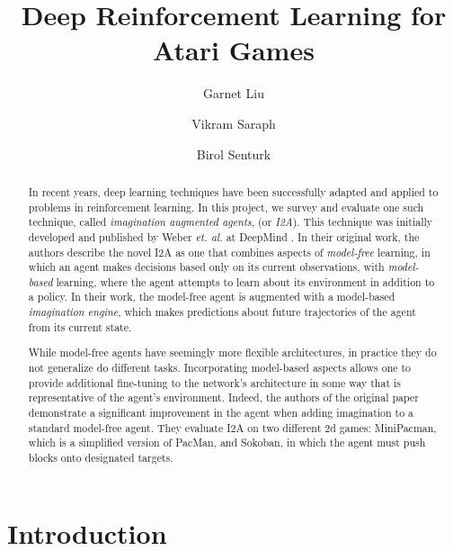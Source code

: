 \documentclass[10pt, twocolumn]{article}
\title{Deep Reinforcement Learning for Atari Games}
\author{Garnet Liu \and Vikram Saraph \and Birol Senturk}
\begin{document}
\maketitle

\begin{abstract}
In recent years, deep learning techniques have been successfully adapted and applied to problems
in reinforcement learning. In this project, we survey and evaluate one such technique, called \emph{imagination augmented agents},
(or \emph{I2A}). This technique was initially developed and published by Weber \emph{et. al.} at DeepMind \cite{}. In their original
work, the authors describe the novel I2A as one that combines aspects of \emph{model-free} learning, in which an agent makes decisions
based only on its current observations, with \emph{model-based} learning, where the agent attempts to learn about its environment
in addition to a policy. In their work, the model-free agent is augmented with a model-based \emph{imagination engine}, which
makes predictions about future trajectories of the agent from its current state.

While model-free agents have seemingly more flexible architectures, in practice they do not generalize do different tasks. Incorporating model-based aspects allows one to provide additional fine-tuning to the network's architecture in some way that is representative of the agent's environment. Indeed, the authors of the original paper demonstrate a significant improvement in the agent when adding imagination to a standard model-free agent. They evaluate I2A on two different 2d games: MiniPacman, which is a simplified version of PacMan, and Sokoban, in which the agent must push blocks onto designated targets. 



\end{abstract}

\section{Introduction}
\end{document}
